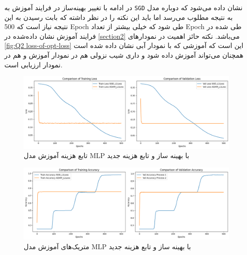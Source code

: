 \documentclass{article}
\begin{document}
در ادامه با تغییر بهینه‌ساز در فرایند آموزش به 
\texttt{SGD}
نشان داده می‌شود که دوباره مدل به نتیجه مطلوب می‌رسد اما باید این نکته را در نظر داشته که بابت رسیدن به این نتیجه نیاز است که 500 
Epoch
طی شود که خیلی بیشتر از تعداد 
Epoch
طی شده در فرایند آموزش نشان داده‌شده در 
\autoref{section2}
 می‌باشد. نکته حائز اهمیت در نمودارهای ‎
 \autoref{fig:Q2 loss-of-opt-loss}
 این است که آموزشی که با نمودار آبی نشان داده شده است همچنان می‌تواند آموزش داده شود و داری شیب نزولی هم در نمودار آموزش و هم در نمودار ارزیابی است.
\begin{figure}[H]
\centering
\includegraphics[width=1\linewidth]{"img/Q2/loss of opt loss"}
\caption{تابع هزینه آموزش مدل MLP با بهینه ساز و تابع هزینه جدید}
\label{fig:Q2 loss-of-opt-loss}
\end{figure}

\begin{figure}[H]
\centering
\includegraphics[width=1\linewidth]{"img/Q2/metric of opt loss"}
\caption{متریک‌های آموزش مدل MLP با بهینه ساز و تابع هزینه جدید}
\label{fig:Q2 metric-of-opt-loss}
\end{figure}
\end{document}

